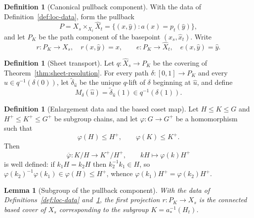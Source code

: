 \documentclass[11pt,reqno]{amsart}
\newtheorem{lemma}[theorem]{Lemma}
\theoremstyle{definition}
\newtheorem{definition}[theorem]{Definition}
\theoremstyle{remark}
\begin{document}
\begin{definition}[Canonical pullback component]\label{def:pullback-component}
With the data of Definition~\ref{def:loc-data}, form the pullback
\begin{equation}\label{eq:pullback}
  P = X_s\times_{X_t}\widehat X_t
    = \bigl\{(x,\widehat y): a(x)=p_t(\widehat y)\bigr\},
\end{equation}
and let \( P_K \) be the path component of the basepoint
\( (x_s,\widehat x_t) \).  Write
\begin{equation}\label{eq:legs}
  r\colon P_K\to X_s,\quad r(x,\widehat y)=x,
  \qquad
  e\colon P_K\to\widehat X_t,\quad e(x,\widehat y)=\widehat y .
\end{equation}
\end{definition}

\begin{definition}[Sheet transport]\label{def:sheet-transport}
Let \( q\colon\widehat X_s\to P_K \) be the covering of
Theorem~\ref{thm:sheet-resolution}.  For every path
\( \delta\colon[0,1]\to P_K \) and every
\( \widehat u\in q^{-1}(\delta(0)) \), let
\( \widetilde\delta_{\widehat u} \) be the unique \( q \)-lift of
\( \delta \) beginning at \( \widehat u \), and define
\begin{equation}\label{eq:transport-def}
  M_\delta(\widehat u)
  = \widetilde\delta_{\widehat u}(1)
  \in q^{-1}(\delta(1)).
\end{equation}
\end{definition}

\begin{definition}[Enlargement data and the based coset map]\label{def:coset-map}
Let
\( H\leq K\leq G \) and \( H^+\leq K^+\leq G^+ \) be subgroup chains, and
let \( \varphi\colon G\to G^+ \) be a homomorphism such that
\begin{equation}\label{eq:coset-map-hyp}
  \varphi(H)\leq H^+,
  \qquad
  \varphi(K)\leq K^+ .
\end{equation}
Then
\begin{equation}\label{eq:coset-map-def}
  \overline\varphi\colon K/H\longrightarrow K^+/H^+,
  \qquad
  kH\longmapsto \varphi(k)H^+
\end{equation}
is well defined: if \( k_1H=k_2H \) then \( k_2^{-1}k_1\in H \), so
\( \varphi(k_2)^{-1}\varphi(k_1)\in\varphi(H)\leq H^+ \), whence
\( \varphi(k_1)H^+=\varphi(k_2)H^+ \).
\end{definition}
\begin{lemma}[Subgroup of the pullback component]\label{lem:pullback-subgroup}
With the data of Definitions~\ref{def:loc-data} and~\ref{def:pullback-component}, the first projection \( r\colon P_K\to X_s \) is the connected based cover of \( X_s \) corresponding to the subgroup \( K=a_*^{-1}(H_t) \).
\end{lemma}
\end{document}
